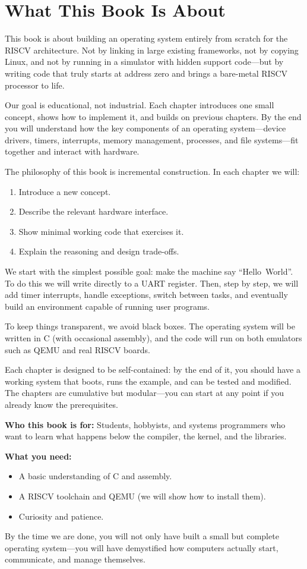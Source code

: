 \chapter{What This Book Is About}

This book is about building an operating system entirely from scratch for the
RISC\textendash V architecture.  Not by linking in large existing frameworks,
not by copying Linux, and not by running in a simulator with hidden support
code—but by writing code that truly starts at address zero and brings a
bare-metal RISC\textendash V processor to life.

Our goal is educational, not industrial.  Each chapter introduces one small
concept, shows how to implement it, and builds on previous chapters.  By the end
you will understand how the key components of an operating system—device
drivers, timers, interrupts, memory management, processes, and file systems—fit
together and interact with hardware.

The philosophy of this book is incremental construction.  In each chapter we
will:
\begin{enumerate}
  \item Introduce a new concept.
  \item Describe the relevant hardware interface.
  \item Show minimal working code that exercises it.
  \item Explain the reasoning and design trade-offs.
\end{enumerate}

We start with the simplest possible goal: make the machine say
``Hello~World''.  To do this we will write directly to a UART register.
Then, step by step, we will add timer interrupts, handle exceptions, switch
between tasks, and eventually build an environment capable of running user
programs.

To keep things transparent, we avoid black boxes.  The operating system will be
written in C (with occasional assembly), and the code will run on both
emulators such as QEMU and real RISC\textendash V boards.

Each chapter is designed to be self-contained: by the end of it, you should
have a working system that boots, runs the example, and can be tested and
modified.  The chapters are cumulative but modular—you can start at any point
if you already know the prerequisites.

\bigskip
\noindent
\textbf{Who this book is for:} Students, hobbyists, and systems programmers who
want to learn what happens below the compiler, the kernel, and the libraries.

\bigskip
\noindent
\textbf{What you need:}
\begin{itemize}
  \item A basic understanding of C and assembly.
  \item A RISC\textendash V toolchain and QEMU (we will show how to install them).
  \item Curiosity and patience.
\end{itemize}

\bigskip
By the time we are done, you will not only have built a small but complete
operating system—you will have demystified how computers actually start,
communicate, and manage themselves.

